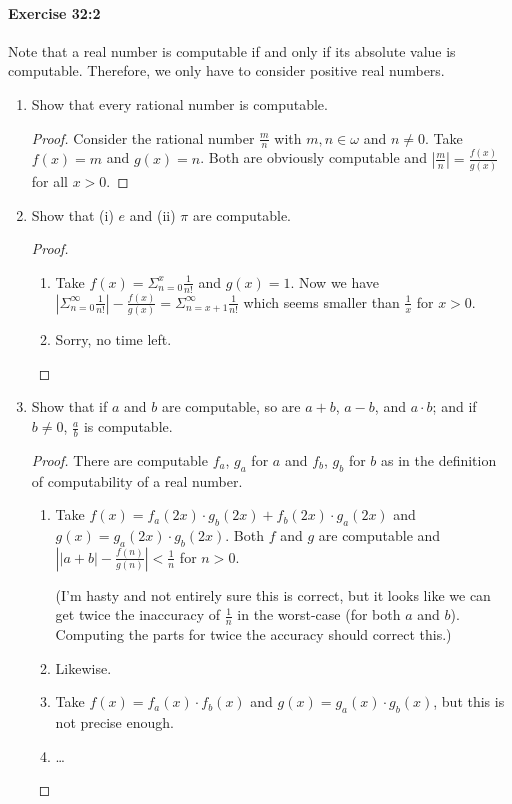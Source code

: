 \documentclass[a4paper,11pt]{article}
\begin{document}
\paragraph{Exercise 32:2}

Note that a real number is computable if and only if its absolute value is
computable. Therefore, we only have to consider positive real numbers.

\begin{enumerate}[label=(\alph*)]

\item
Show that every rational number is computable.

\begin{proof}
Consider the rational number $\frac{m}{n}$ with $m, n \in \omega$ and $n \neq 0$.
Take $f(x) = m$ and $g(x) = n$.
Both are obviously computable and $|\frac{m}{n}| = \frac{f(x)}{g(x)}$ for all $x > 0$.
\end{proof}

\item
Show that (i) $e$ and (ii) $\pi$ are computable.

\begin{proof}
\begin{enumerate}[label=(\roman*)]
\item Take $f(x) = \Sigma_{n=0}^x \frac{1}{n!}$ and $g(x) = 1$.
Now we have $|\Sigma_{n=0}^\infty \frac{1}{n!}| - \frac{f(x)}{g(x)} = \Sigma_{n=x+1}^\infty \frac{1}{n!}$
which seems smaller than $\frac{1}{x}$ for $x > 0$.
\item Sorry, no time left.\qedhere
\end{enumerate}
\end{proof}

\item
Show that if $a$ and $b$ are computable, so are $a + b$, $a - b$, and $a \cdot b$; and if $b \neq 0$,
$\frac{a}{b}$ is computable.

\begin{proof}
There are computable $f_a$, $g_a$ for $a$ and $f_b$, $g_b$ for $b$ as in the definition of
computability of a real number.

\begin{enumerate}[label=(\roman*)]
\item
Take $f(x) = f_a(2x) \cdot g_b(2x) + f_b(2x) \cdot g_a(2x)$ and $g(x) = g_a(2x) \cdot g_b(2x)$.
Both $f$ and $g$ are computable and $\left|\left|a+b\right| - \frac{f(n)}{g(n)}\right| < \frac{1}{n}$ for $n > 0$.

(I'm hasty and not entirely sure this is correct, but it looks like we can get twice the inaccuracy
of $\frac{1}{n}$ in the worst-case (for both $a$ and $b$). Computing the parts for twice the
accuracy should correct this.)
\item
Likewise.
\item
Take $f(x) = f_a(x) \cdot f_b(x)$ and $g(x) = g_a(x) \cdot g_b(x)$, but this is not precise enough.
\item \ldots \qedhere
\end{enumerate}
\end{proof}


\end{enumerate}
\end{document}
